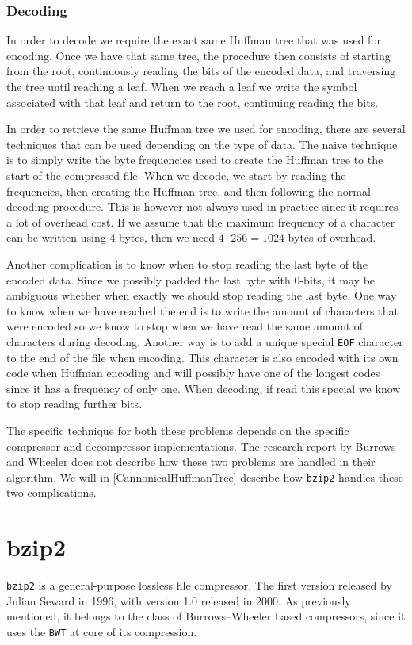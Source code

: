 \documentclass{article}
\begin{document}
\subsubsection{Decoding}\label{SectionHuffmanDecoding}
In order to decode we require the exact same Huffman tree that was used for encoding. Once we have that same tree, the procedure then consists of starting from the root, continuously reading the bits of the encoded data, and traversing the tree until reaching a leaf. When we reach a leaf we write the symbol associated with that leaf and return to the root, continuing reading the bits.

In order to retrieve the same Huffman tree we used for encoding, there are several techniques that can be used depending on the type of data. The naive technique is to simply write the byte frequencies used to create the Huffman tree to the start of the compressed file. When we decode, we start by reading the frequencies, then creating the Huffman tree, and then following the normal decoding procedure. This is however not always used in practice since it requires a lot of overhead cost. If we assume that the maximum frequency of a character can be written using 4 bytes, then we need \(4 \cdot 256 = 1024\) bytes of overhead.

Another complication is to know when to stop reading the last byte of the encoded data. Since we possibly padded the last byte with 0-bits, it may be ambiguous whether when exactly we should stop reading the last byte.
One way to know when we have reached the end is to write the amount of characters that were encoded so we know to stop when we have read the same amount of characters during decoding. Another way is to add a unique special \texttt{EOF} character to the end of the file when encoding. This character is also encoded with its own code when Huffman encoding and will possibly have one of the longest codes since it has a frequency of only one. When decoding, if read this special we know to stop reading further bits.

The specific technique for both these problems depends on the specific compressor and decompressor implementations. The research report by Burrows and Wheeler does not describe how these two problems are handled in their algorithm. We will in \cref{CannonicalHuffmanTree} describe how \texttt{bzip2} handles these two complications.



\section{bzip2}\label{sec:BZIP2}
\texttt{bzip2} is a general-purpose lossless file compressor. The first version released by Julian Seward in 1996, with version 1.0 released in 2000. As previously mentioned, it belongs to the class of Burrows--Wheeler based compressors, since it uses the \texttt{BWT} at core of its compression.
\end{document}
